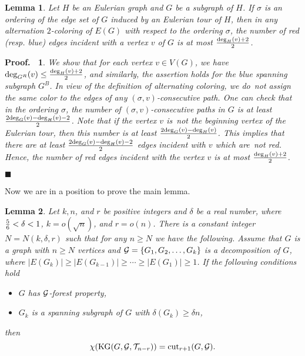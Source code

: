 \documentclass[11pt]{article}
\newtheorem{prelem}{{\bf Lemma}}
\newenvironment{lem}{\begin{prelem}{\hspace{-0.5
               em}{\bf.\ }}}{\end{prelem}}
\newtheorem{preproof}{{\bf Proof.\ }}
\newenvironment{proof}[1]{\begin{preproof}{\rm
               #1}\hfill{$\blacksquare$}}{\end{preproof}}
\begin{document}
\begin{lem}\label{orderinglemma}
Let $H$ be an Eulerian graph and $G$ be a subgraph of $H$. 
If $\sigma$ is an ordering of the edge set of $G$ induced by an Eulerian 
tour of $H$, then in any alternation $2$-coloring of $E(G)$ with respect to the ordering $\sigma$, the number of red {\rm(}resp. blue{\rm)} 
edges incident with a vertex $v$ of $G$ is at most ${{\rm deg}_H(v)+2\over 2}$. 
\end{lem}
\begin{proof}{
We show that for each vertex $v\in V(G)$, we have ${\rm deg}_{G^R}(v)\leq {{\rm deg}_H(v)+2\over 2}$, and similarly, the assertion holds for the blue spanning subgraph $G^B$. 
In view of the definition of alternating coloring, we do~not assign the same color to the edges of any 
$(\sigma,v)$-consecutive path. One can check that in the ordering $\sigma$, the number of 
$(\sigma,v)$-consecutive paths in $G$ is at least ${2{\rm deg}_G(v)-{\rm deg}_H(v)-2\over 2}$. 
Note that if the vertex $v$ is~not the beginning vertex of the Eulerian tour, then this number is at least 
${2{\rm deg}_G(v)-{\rm deg}_H(v)\over 2}$.
This implies that there are at least  ${2{\rm deg}_G(v)-{\rm deg}_H(v)-2\over 2}$ edges incident with $v$ 
which are~not red. Hence, 
the number of red edges incident with the vertex $v$ is at most ${{\rm deg}_H(v)+2\over 2}$. 
}\end{proof}
Now we are in a position to prove the main lemma.
\begin{lem}\label{main}
Let $k, n$, and $r$ be positive integers and $\delta $ be a real number, where 
${5\over 6}< \delta < 1$, $k=o(\sqrt{n})$, 
and $r=o(n)$. There is a constant integer
$N=N(k,\delta,r)$ such that for any $n\geq N$ we have the following. 
Assume that $G$ is a graph with $n\geq N$ vertices and ${\cal G}=\{G_1,G_2,\ldots,G_k\}$ is a 
decomposition of $G$, 
where $|E(G_k)|\geq |E(G_{k-1})|\geq \cdots\geq |E(G_1)|\geq 1$. If 
the following conditions hold
\begin{itemize}
\item $G$ has ${\cal G}$-forest property, 
\item $G_k$ is a spanning subgraph of $G$ with $\delta(G_k)\geq \delta n$, 
\end{itemize}
then
$$\chi({\rm KG}(G, {\cal G}, {\cal T}_{ n-r}))={\rm cut}_{r+1}(G, {\cal G}).$$
\end{lem}
\end{document}
